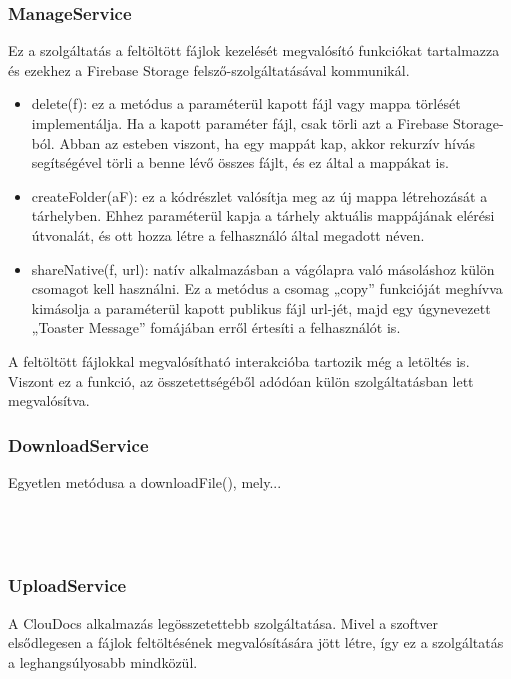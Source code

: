 \documentclass[12pt]{report}
\begin{document}
\subsubsection{ManageService}
Ez a szolgáltatás a feltöltött fájlok kezelését megvalósító funkciókat tartalmazza és ezekhez a Firebase Storage felsző-szolgáltatásával kommunikál.

\begin{itemize}
	\item delete(f): ez a metódus a paraméterül kapott fájl vagy mappa törlését implementálja. Ha a kapott paraméter fájl, csak törli azt a Firebase Storage-ból. Abban az esteben viszont, ha egy mappát kap, akkor rekurzív hívás segítségével törli a benne lévő összes fájlt, és ez által a mappákat is.
	\item createFolder(aF): ez a kódrészlet valósítja meg az új mappa létrehozását a tárhelyben. Ehhez paraméterül kapja a tárhely aktuális mappájának elérési útvonalát, és ott hozza létre a felhasználó által megadott néven.
	\item shareNative(f, url): natív alkalmazásban a vágólapra való másoláshoz külön csomagot kell használni. Ez a metódus a csomag „copy” funkcióját meghívva kimásolja a paraméterül kapott publikus fájl url-jét, majd egy úgynevezett „Toaster Message” fomájában erről értesíti a felhasználót is.
\end{itemize}

A feltöltött fájlokkal megvalósítható interakcióba tartozik még a letöltés is. Viszont ez a funkció, az összetettségéből adódóan külön szolgáltatásban lett megvalósítva.

\subsubsection{DownloadService}
Egyetlen metódusa a downloadFile(), mely... \\
\\
\\
\\

\subsubsection{UploadService}
A ClouDocs alkalmazás legösszetettebb szolgáltatása. Mivel a szoftver elsődlegesen a fájlok feltöltésének megvalósítására jött létre, így ez a szolgáltatás a leghangsúlyosabb mindközül.
\end{document}
